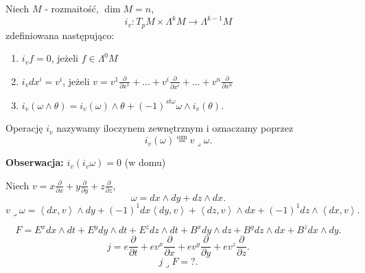 \documentclass[../main.tex]{subfiles}
\begin{document}
\pagebreak
\begin{definicja}
    Niech $M$ - rozmaitość, $\dim M = n$,\\
    \[
        i_v : T_pM \times \Lambda^kM\to \Lambda^{k-1}M
    \]
    zdefiniowana następująco:
    \begin{enumerate}
        \item $i_v f = 0$, jeżeli $f\in \Lambda^0M$
        \item  $i_v dx^i = v^i$, jeżeli $v = v^1 \frac{\partial }{\partial x^1} + \ldots + v^i \frac{\partial }{\partial x^i} + \ldots + v^n \frac{\partial }{\partial x^n} $
        \item $i_v(\omega\land \theta) = i_v(\omega)\land \theta + (-1)^{st \omega} \omega\land i_v(\theta)$.
    \end{enumerate}
    Operację $i_v$ nazywamy iloczynem zewnętrznym i oznaczamy poprzez
    \[
        i_v(\omega) \overset{\text{ozn}}{=} v \lrcorner \omega
    .\]
\end{definicja}
\textbf{Obserwacja:} $i_v(i_v\omega) = 0 $ (w domu)
\begin{przyklad}
    Niech $v = x \frac{\partial }{\partial x} + y \frac{\partial }{\partial y} + z \frac{\partial }{\partial z} $,
    \[
    \omega = dx\land dy + dz \land dx
    .\]
\[
    v \lrcorner \omega = \left<dx, v \right> \land dy + (-1)^1 dx\left<dy,v \right> + \left<dz, v \right>\land dx + (-1)^1 dz\land \left<dx, v \right>
.\]
\end{przyklad}
\begin{przyklad}
    \[
     F = E^xdx\land dt + E^ydy\land dt + E^z dz\land dt + B^x dy\land dz + B^ydz\land dx + B^zdx\land dy
    .\]
\[
j = e \frac{\partial }{\partial t} + ev^x \frac{\partial }{\partial x}  + ev^y \frac{\partial }{\partial y} + ev^z \frac{\partial }{\partial z}
.\]
\[
    j \lrcorner  F = ?
.\]
\end{przyklad}
\end{document}
